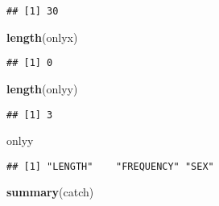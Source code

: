 \documentclass[
]{article}
\newenvironment{Shaded}{\begin{snugshade}}{\end{snugshade}}
\newcommand{\KeywordTok}[1]{\textcolor[rgb]{0.13,0.29,0.53}{\textbf{#1}}}
\newcommand{\NormalTok}[1]{#1}
\begin{document}
\begin{verbatim}
## [1] 30
\end{verbatim}

\begin{Shaded}
\begin{Highlighting}[]
\KeywordTok{length}\NormalTok{(onlyx)}
\end{Highlighting}
\end{Shaded}

\begin{verbatim}
## [1] 0
\end{verbatim}

\begin{Shaded}
\begin{Highlighting}[]
\KeywordTok{length}\NormalTok{(onlyy)}
\end{Highlighting}
\end{Shaded}

\begin{verbatim}
## [1] 3
\end{verbatim}

\begin{Shaded}
\begin{Highlighting}[]
\NormalTok{onlyy}
\end{Highlighting}
\end{Shaded}

\begin{verbatim}
## [1] "LENGTH"    "FREQUENCY" "SEX"
\end{verbatim}

\begin{Shaded}
\begin{Highlighting}[]
\KeywordTok{summary}\NormalTok{(catch)}
\end{Highlighting}
\end{Shaded}
\end{document}
